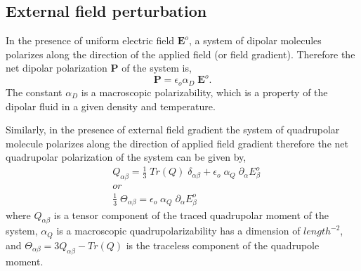 \subsection{External field perturbation}
\label{subsec:perturbation}
In the presence of uniform electric field $\textbf{E}^o$, a system of dipolar  molecules polarizes along the direction of the applied field (or field gradient). Therefore the net dipolar polarization $ \textbf{P}$ of the system is,
\begin{equation}
\textbf{P} = \epsilon_o \alpha_{D}\; \textbf{E}^o. 
\label{pertDipole}
\end{equation} 
The constant $\alpha_D$ is a macroscopic polarizability, which is a property of the dipolar fluid in a given density and temperature.

Similarly, in the presence of external field gradient the system of quadrupolar molecule polarizes along the direction of applied field gradient therefore the net quadrupolar polarization of the system can be given by,
\begin{equation}
\begin{split}
& {Q}_{\alpha\beta} = \frac{1}{3}\; Tr({Q})\; \delta_{\alpha\beta} +  \epsilon_o\; \alpha_Q \; \partial_{\alpha} E^o_{\beta} 
\\ & or \\
& \frac{1}{3}\;\Theta_{\alpha\beta} =  \epsilon_o\; \alpha_Q \; \partial_{\alpha} E^o_{\beta} 
\end{split}
\label{pertQuad}
\end{equation} 
where $Q_{\alpha\beta}$ is a tensor component of the traced quadrupolar moment of the system, $ \alpha_Q$ is a macroscopic quadrupolarizability has a dimension of $length^{-2}$, and $\Theta_{\alpha\beta} = 3Q_{\alpha\beta}-Tr(Q) $ is the traceless component of the quadrupole moment.    

